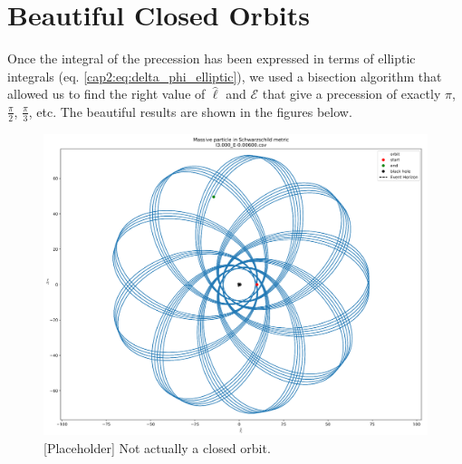 \chapter{Beautiful Closed Orbits}
\label{app:beautiful}

Once the integral of the precession has been expressed in terms of elliptic
integrals (eq. \ref{cap2:eq:delta_phi_elliptic}), we used a bisection algorithm
that allowed us to find the right value of $\hat \ell$ and
$\mathcal E$ that give a precession of exactly $\pi$, $\frac{\pi}{2}$,
$\frac{\pi}{3}$, etc.
The beautiful results are shown in the figures below.

\begin{figure}[h]
    \centering
    \includegraphics[width=\textwidth]{Figures/chapter2/wow0.png}
    \caption{[Placeholder] Not actually a closed orbit.}
    \label{cap2:fig:wow0}
\end{figure}
%
%
%
